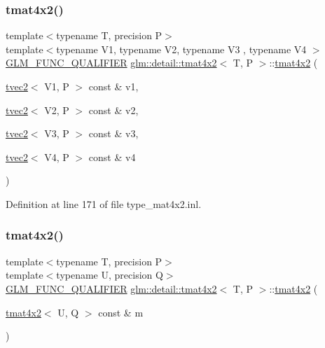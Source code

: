 \subsubsection{\texorpdfstring{tmat4x2()}{tmat4x2()}\hspace{0.1cm}{\footnotesize\ttfamily [21/22]}}
{\footnotesize\ttfamily template$<$typename T, precision P$>$ \\
template$<$typename V1, typename V2, typename V3 , typename V4 $>$ \\
\hyperlink{setup_8hpp_a33fdea6f91c5f834105f7415e2a64407}{G\+L\+M\+\_\+\+F\+U\+N\+C\+\_\+\+Q\+U\+A\+L\+I\+F\+I\+ER} \hyperlink{structglm_1_1detail_1_1tmat4x2}{glm\+::detail\+::tmat4x2}$<$ T, P $>$\+::\hyperlink{structglm_1_1detail_1_1tmat4x2}{tmat4x2} (\begin{DoxyParamCaption}\item[{\hyperlink{structglm_1_1detail_1_1tvec2}{tvec2}$<$ V1, P $>$ const \&}]{v1,  }\item[{\hyperlink{structglm_1_1detail_1_1tvec2}{tvec2}$<$ V2, P $>$ const \&}]{v2,  }\item[{\hyperlink{structglm_1_1detail_1_1tvec2}{tvec2}$<$ V3, P $>$ const \&}]{v3,  }\item[{\hyperlink{structglm_1_1detail_1_1tvec2}{tvec2}$<$ V4, P $>$ const \&}]{v4 }\end{DoxyParamCaption})}



Definition at line 171 of file type\+\_\+mat4x2.\+inl.

\mbox{\label{structglm_1_1detail_1_1tmat4x2_a81ca48dabefc74d85c49880c33f0f6e5}} 
\subsubsection{\texorpdfstring{tmat4x2()}{tmat4x2()}\hspace{0.1cm}{\footnotesize\ttfamily [22/22]}}
{\footnotesize\ttfamily template$<$typename T, precision P$>$ \\
template$<$typename U, precision Q$>$ \\
\hyperlink{setup_8hpp_a33fdea6f91c5f834105f7415e2a64407}{G\+L\+M\+\_\+\+F\+U\+N\+C\+\_\+\+Q\+U\+A\+L\+I\+F\+I\+ER} \hyperlink{structglm_1_1detail_1_1tmat4x2}{glm\+::detail\+::tmat4x2}$<$ T, P $>$\+::\hyperlink{structglm_1_1detail_1_1tmat4x2}{tmat4x2} (\begin{DoxyParamCaption}\item[{\hyperlink{structglm_1_1detail_1_1tmat4x2}{tmat4x2}$<$ U, Q $>$ const \&}]{m }\end{DoxyParamCaption})}



